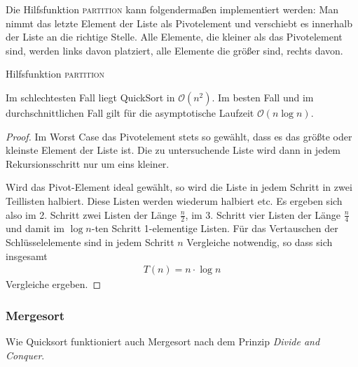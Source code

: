 Die Hilfsfunktion \textsc{partition} kann folgendermaßen implementiert werden: Man nimmt das letzte Element der Liste als Pivotelement und verschiebt es innerhalb der Liste an die richtige Stelle. Alle Elemente, die kleiner als das Pivotelement sind, werden links davon platziert, alle Elemente die größer sind, rechts davon.

\begin{algorithm}
	\caption{Hilfsfunktion \textsc{partition}}
	\begin{algorithmic}
		 
		 
		\State {}
		\EndIf
		\EndFor
		\EndProcedure
	\end{algorithmic}
\end{algorithm}

\begin{proposition}[Laufzeit]
	Im schlechtesten Fall liegt QuickSort in $\mathcal{O}(n^2)$. Im besten Fall und im durchschnittlichen Fall gilt für die asymptotische Laufzeit $\mathcal{O}(n \log n)$.
\end{proposition}
\begin{proof}
	Im Worst Case das Pivotelement stets so gewählt, dass es das größte oder kleinste Element der Liste ist. Die zu untersuchende Liste wird dann in jedem Rekursionsschritt nur um eins kleiner.

	Wird das Pivot-Element ideal gewählt, so wird die Liste in jedem Schritt in zwei Teillisten halbiert. Diese Listen werden wiederum halbiert etc. Es ergeben sich also im 2. Schritt zwei Listen der Länge $\frac{n}{2}$, im 3. Schritt vier Listen der Länge $\frac{n}{4}$ und damit im $\log{n}$-ten Schritt 1-elementige Listen. Für das Vertauschen der Schlüsselelemente sind in jedem Schritt $n$ Vergleiche notwendig, so dass sich insgesamt
	\begin{gather*}
		T(n) = n \cdot \log n
	\end{gather*}
	Vergleiche ergeben.
\end{proof}

\subsubsection{Mergesort}
Wie Quicksort funktioniert auch Mergesort nach dem Prinzip \emph{Divide and Conquer}.

